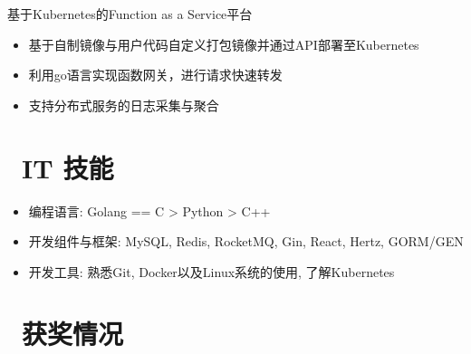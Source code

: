 \documentclass{resume}
\begin{document}
\begin{onehalfspacing}
基于Kubernetes的Function as a Service平台
\begin{itemize}
  \item 基于自制镜像与用户代码自定义打包镜像并通过API部署至Kubernetes
  \item 利用go语言实现函数网关，进行请求快速转发
  \item 支持分布式服务的日志采集与聚合
\end{itemize}
\end{onehalfspacing}


\section{\faCogs\ IT 技能}
\begin{itemize}[parsep=0.5ex]
  \item 编程语言: Golang == C > Python > C++
  \item 开发组件与框架: MySQL, Redis, RocketMQ, Gin, React, Hertz, GORM/GEN
  \item 开发工具: 熟悉Git, Docker以及Linux系统的使用,  了解Kubernetes
\end{itemize}

\section{\faHeartO\ 获奖情况}

%
%
\end{document}
